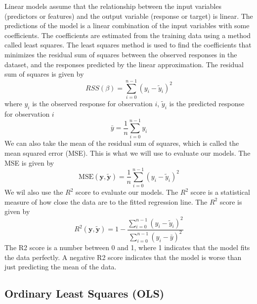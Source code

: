 \documentclass[twoside,11pt]{report}
\begin{document}
Linear models assume that the relationship between the input variables (predictors or features) 
and the output variable (response or target) is linear. The predictions of the model is a linear
combination of the input variables with some coefficients. The coefficients are estimated from
the training data using a method called least squares. The least squares method is used to find
the coefficients that minimizes the residual sum of squares between the observed responses in
the dataset, and the responses predicted by the linear approximation. The residual sum of squares
is given by
$$
RSS(\beta) = \sum_{i=0}^{n-1} (y_i - \tilde{y}_i)^2
$$
where $y_i$ is the observed response for observation $i$, $\tilde{y}_i$ is the predicted response for observation $i$ 
$$
\bar{y} =  \frac{1}{n} \sum_{i=0}^{n - 1} y_i
$$
We can also take the mean of the residual sum of squares, which is called the mean squared error (MSE). This is what we will use to
evaluate our models. The MSE is given by
$$
\mbox{MSE}(\mathbf{y},\mathbf{\tilde{y}}) = \frac{1}{n}
\sum_{i=0}^{n-1}(y_i-\tilde{y}_i)^2
$$
We wil also use the $R^2$ score to evaluate our models. The $R^2$ score is a statistical measure of how close the data are to the fitted regression line. The $R^2$ score is given by
$$
R^2(\mathbf{y}, \tilde{\mathbf{y}}) = 1 - \frac{\sum_{i=0}^{n - 1} (y_i - \tilde{y}_i)^2}{\sum_{i=0}^{n - 1} (y_i - \bar{y})^2}
$$
The R2 score is a number between 0 and 1, where 1 indicates that the model fits the data perfectly. 
A negative R2 score indicates that the model is worse than just predicting the mean of the data.





\subsection{Ordinary Least Squares (OLS)}
\label{sec:ols}
\end{document}
